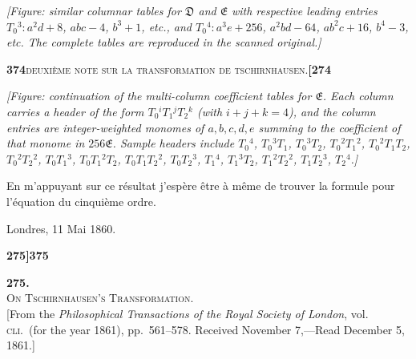 \documentclass[11pt]{article}
\begin{document}
\medskip

\textit{[Figure: similar columnar tables for $\mathfrak{D}$ and $\mathfrak{E}$ with respective leading entries $T_0{}^3: a^2 d + 8$, $abc - 4$, $b^3 + 1$, etc., and $T_0{}^4: a^3 e + 256$, $a^2 bd - 64$, $a b^2 c + 16$, $b^4 - 3$, etc. The complete tables are reproduced in the scanned original.]}

\newpage
\noindent\textbf{374}\hfill\textsc{deuxi\`eme note sur la transformation de tschirnhausen.}\hfill\textbf{[274}

\medskip

\noindent \textit{[Figure: continuation of the multi-column coefficient tables for $\mathfrak{E}$. Each column carries a header of the form $T_0{}^i T_1{}^j T_2{}^k$ (with $i+j+k=4$), and the column entries are integer-weighted monomes of $a, b, c, d, e$ summing to the coefficient of that monome in $256 \mathfrak{E}$. Sample headers include $T_0{}^4$, $T_0{}^3 T_1$, $T_0{}^3 T_2$, $T_0{}^2 T_1{}^2$, $T_0{}^2 T_1 T_2$, $T_0{}^2 T_2{}^2$, $T_0 T_1{}^3$, $T_0 T_1{}^2 T_2$, $T_0 T_1 T_2{}^2$, $T_0 T_2{}^3$, $T_1{}^4$, $T_1{}^3 T_2$, $T_1{}^2 T_2{}^2$, $T_1 T_2{}^3$, $T_2{}^4$.]}

\medskip

En m'appuyant sur ce r\'esultat j'esp\`ere \^etre \`a m\^eme de trouver la formule pour l'\'equation du cinqui\`eme ordre.

\medskip

\hfill Londres, 11 Mai 1860.


\newpage
\noindent\textbf{275]}\hfill\textbf{375}

\medskip

\begin{center}
{\Large\bfseries 275.}\\[1em]
{\large\scshape On Tschirnhausen's Transformation.}\\[1em]
{\small [From the \textit{Philosophical Transactions of the Royal Society of London}, vol. \textsc{cli}.\ (for the year 1861), pp.~561--578. Received November 7,---Read December 5, 1861.]}
\end{center}

\medskip
\end{document}
